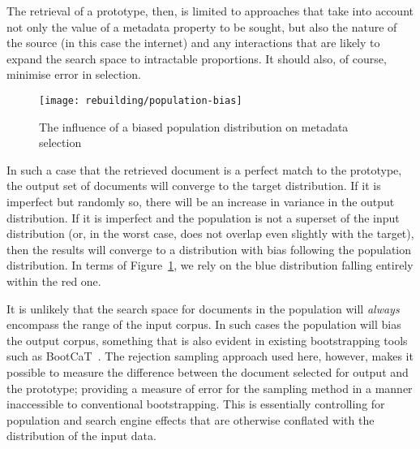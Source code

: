 The retrieval of a prototype, then, is limited to approaches that take into account not only the value of a metadata property to be sought, but also the nature of the source (in this case the internet) and any interactions that are likely to expand the search space to intractable proportions.  It should also, of course, minimise error in selection.


\begin{figure}[h]
    \centering
    \texttt{[image: rebuilding/population-bias]}
    \caption{The influence of a biased population distribution on metadata selection}
    \label{fig:rebuilding:population-bias}
\end{figure}


In such a case that the retrieved document is a perfect match to the prototype, the output set of documents will converge to the target distribution.  If it is imperfect but randomly so, there will be an increase in variance in the output distribution.  If it is imperfect and the population is not a superset of the input distribution (or, in the worst case, does not overlap even slightly with the target), then the results will converge to a distribution with bias following the population distribution.  In terms of Figure~\ref{fig:rebuilding:population-bias}, we rely on the blue distribution falling entirely within the red one.


It is unlikely that the search space for documents in the population will \textsl{always} encompass the range of the input corpus.  In such cases the population will bias the output corpus, something that is also evident in existing bootstrapping tools such as BootCaT~\cite{baroni2004bootcat}.  The rejection sampling approach used here, however, makes it possible to measure the difference between the document selected for output and the prototype; providing a measure of error for the sampling method in a manner inaccessible to conventional bootstrapping.  This is essentially controlling for population and search engine effects that are otherwise conflated with the distribution of the input data.


